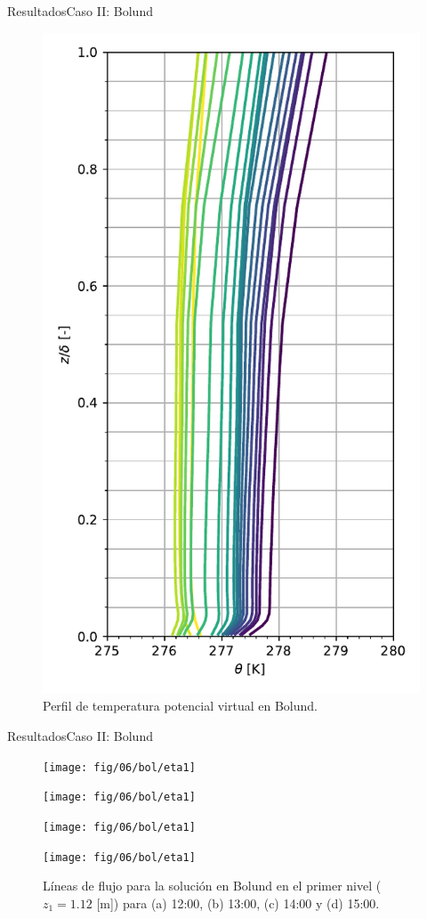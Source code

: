 \documentclass[mathserif,10pt]{beamer}
\begin{document}
\begin{frame}{Resultados}{Caso II: Bolund}
\begin{figure}[H]
\begin{minipage}{0.5\linewidth}
			\includegraphics[width=0.75\linewidth,trim={0cm 5mm 0cm 0cm},clip]{fig/06/bol/mean_profile}%
		\end{minipage}%
		
		\caption{Perfil de temperatura potencial virtual en Bolund.}
		\label{fig:06_bol_pbl}
	\end{figure}
\end{frame}

\begin{frame}{Resultados}{Caso II: Bolund}
	\begin{figure}[H]
		\begin{minipage}{0.5\linewidth}
			\centering
			\texttt{[image: fig/06/bol/eta1]}%
		\end{minipage}%
		\begin{minipage}{0.5\linewidth}
			\centering
			\texttt{[image: fig/06/bol/eta1]}%
		\end{minipage}%
		\vspace{1mm}
		
		\begin{minipage}{0.5\linewidth}
			\centering
			\texttt{[image: fig/06/bol/eta1]}%
		\end{minipage}%
		\begin{minipage}{0.5\linewidth}
			\centering
			\texttt{[image: fig/06/bol/eta1]}%
		\end{minipage}%
		\caption{Líneas de flujo para la solución en Bolund en el primer nivel ($z_1 = 1.12$ [m]) para (a) 12:00, (b) 13:00, (c) 14:00 y (d) 15:00.}
		\label{fig:06_bol_st}
	\end{figure}
\end{frame}
\end{document}
